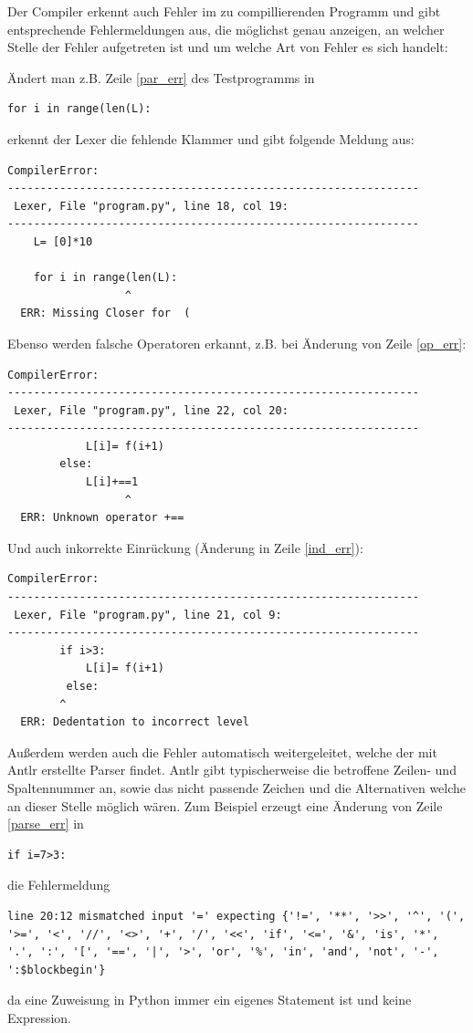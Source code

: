 Der Compiler erkennt auch Fehler im zu compillierenden Programm und gibt entsprechende Fehlermeldungen aus, die möglichst genau anzeigen, an welcher Stelle der Fehler aufgetreten ist und um welche Art von Fehler es sich handelt:

Ändert man z.B. Zeile \ref{par_err} des Testprogramms in
\begin{lstlisting}
for i in range(len(L):
\end{lstlisting}

erkennt der Lexer die fehlende Klammer und gibt folgende Meldung aus:
\begin{lstlisting}
CompilerError: 
---------------------------------------------------------------
 Lexer, File "program.py", line 18, col 19:
---------------------------------------------------------------
    L= [0]*10

    for i in range(len(L):
                  ^
  ERR: Missing Closer for  ( 
\end{lstlisting}

\clearpage

Ebenso werden falsche Operatoren erkannt, z.B. bei Änderung von Zeile \ref{op_err}:
\begin{lstlisting}
CompilerError: 
---------------------------------------------------------------
 Lexer, File "program.py", line 22, col 20:
---------------------------------------------------------------
            L[i]= f(i+1)
        else:
            L[i]+==1
                  ^
  ERR: Unknown operator +==
\end{lstlisting}

Und auch inkorrekte Einrückung (Änderung in Zeile \ref{ind_err}):
\begin{lstlisting}
CompilerError: 
---------------------------------------------------------------
 Lexer, File "program.py", line 21, col 9:
---------------------------------------------------------------
        if i>3:
            L[i]= f(i+1)
         else:
        ^
  ERR: Dedentation to incorrect level  
\end{lstlisting}

Außerdem werden auch die Fehler automatisch weitergeleitet, welche der mit Antlr erstellte Parser findet. Antlr gibt typischerweise die betroffene Zeilen- und Spaltennummer an, sowie das nicht passende Zeichen und die Alternativen welche an dieser Stelle möglich wären. Zum Beispiel erzeugt eine Änderung von Zeile \ref{parse_err} in
\begin{lstlisting}
if i=7>3:
\end{lstlisting}
die Fehlermeldung
\begin{lstlisting}
line 20:12 mismatched input '=' expecting {'!=', '**', '>>', '^', '(', '>=', '<', '//', '<>', '+', '/', '<<', 'if', '<=', '&', 'is', '*', '.', ':', '[', '==', '|', '>', 'or', '%', 'in', 'and', 'not', '-', ':$blockbegin'}
\end{lstlisting}
da eine Zuweisung in Python immer ein eigenes Statement ist und keine Expression.\\


